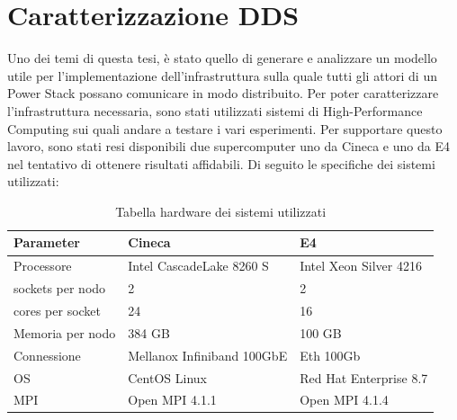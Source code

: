 \chapter{Caratterizzazione DDS}
Uno dei temi di questa tesi, è stato quello di generare e  analizzare un modello utile per l'implementazione dell'infrastruttura sulla quale tutti gli attori di un Power Stack possano comunicare in modo distribuito. Per poter caratterizzare  l'infrastruttura necessaria, sono stati utilizzati sistemi di High-Performance Computing sui quali andare a testare i vari esperimenti. Per supportare questo lavoro, sono stati resi disponibili due supercomputer uno da Cineca\cite{Cineca} e uno da E4\cite{E4} nel tentativo di ottenere risultati affidabili. Di seguito le specifiche dei sistemi utilizzati:

\begin{table}[H]
\begin{center}
\begin{tabular}{l|l|l}
    \hline
    \textbf{Parameter} & \textbf{Cineca} & \textbf{E4} \\
    \hline
    Processore & Intel CascadeLake 8260 S & Intel Xeon Silver 4216 \\
    \hline
    [\#] sockets per nodo & 2 & 2 \\
    \hline
    [\#]  cores per socket & 24 & 16 \\
    \hline
    Memoria per nodo & 384 GB & 100 GB\\
    \hline
    Connessione & Mellanox Infiniband 100GbE & Eth 100Gb\\
    \hline
    OS & CentOS Linux &  Red Hat Enterprise 8.7\\ 
    \hline
    MPI & Open MPI 4.1.1 & Open MPI 4.1.4 \\
    \hline
\end{tabular}
\end{center}
\caption{Tabella hardware dei sistemi utilizzati}
\label{table:hpc-cineca}
\end{table}



